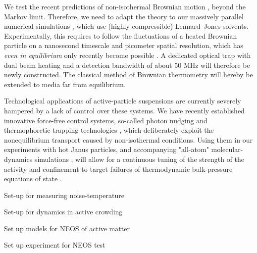\begin{workpackage}[id=WPactive,wphases=0-48,
  short=Active Particle Suspensions,%
  title=Probing active particle suspensions with colloids and polymers,
  lead=ULEI,
  ULEIRM=96,UNIPDRM=6,USTUTTRM=2]
\begin{tasklist}
\begin{task}[title=Noise Temperature,id=task3,lead=ULEI,wphases=0-24!0.5]
We test the recent predictions of non-isothermal Brownian motion \cite{rings-etal:2010,falasco-etal:2014}, 
beyond the Markov limit. Therefore, we need to adapt the theory 
to our massively parallel numerical simulations \cite{chakraborty-etal:2011}, 
which use (highly compressible) Lennard--Jones solvents.
Experimentally, this requires to follow the fluctuations of 
a heated Brownian particle on a nanosecond timescale and picometer spatial resolution, which has
\emph{even in equilibrium} only recently become possible  \cite{kheifets-etal:2014}.
%
A dedicated optical trap with dual beam heating and a detection bandwidth of about 50 MHz
will therefore be newly constructed. 
%
The classical method of Brownian thermometry will hereby be extended to media far from equilibrium.
\end{task}

\begin{task}[title=Active-Particle Suspensions,id=task4,lead=ULEI,wphases=24-48!0.5]
Technological applications of active-particle suspensions  are
currently severely hampered by a lack of control over these systems.
%
We have recently established innovative force-free control systems, so-called photon nudging
and thermophoretic trapping technologies \cite{Qian2013,Braun:NanoLetters:2015}, which deliberately exploit 
the nonequilibrium transport caused by non-isothermal conditions.
%
Using them in our experiments with hot Janus particles, and accompanying "all-atom" molecular-dynamics 
simulations \cite{chakraborty-etal:2011}, will allow for a continuous tuning of the strength of 
the activity and confinement to target failures of thermodynamic bulk-pressure equations of
state \cite{ginot-etal:2015}.
\end{task}


\end{tasklist}

\printbibliography[heading=proposal-bib,env=proposal-env]

\begin{wpdelivs}
\begin{wpdeliv}[due=12,id=D2.3,dissem=PU,nature=R,lead=ULEI]
      {Set-up for measuring noise-temperature}
  \end{wpdeliv}
  \begin{wpdeliv}[due=24,id=D2.1,dissem=PU,nature=R,lead=ULEI]
      {Set-up for dynamics in active crowding}
  \end{wpdeliv}
  \begin{wpdeliv}[due=24,id=D2.2,dissem=PU,nature=R,lead=ULEI]
      {Set up models for NEOS of active matter}
\end{wpdeliv}
  \begin{wpdeliv}[due=36,id=D2.4,dissem=PU,nature=R,lead=ULEI]
      {Set up experiment for NEOS test}
\end{wpdeliv}
\end{wpdelivs}

\end{workpackage}
